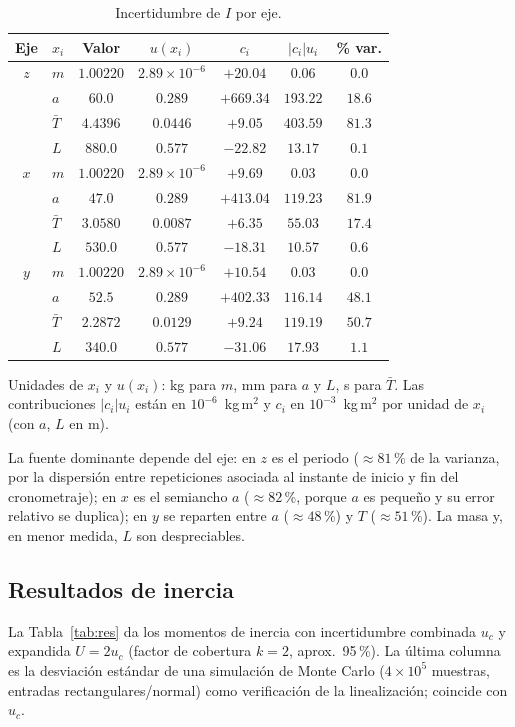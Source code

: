 \begin{table}[H]
\centering
\caption{Incertidumbre de $I$ por eje.}\label{tab:bud}
\small
\begin{tabular}{clccccc}
\toprule
Eje & $x_i$ & Valor & $u(x_i)$ & $c_i$ & $|c_i|u_i$ & \% var. \\
\midrule
$z$ & $m$ & $1.00220$ & $2.89\times10^{-6}$ & $+20.04$ & $0.06$ & $0.0$ \\
 & $a$ & $60.0$ & $0.289$ & $+669.34$ & $193.22$ & $18.6$ \\
 & $\bar T$ & $4.4396$ & $0.0446$ & $+9.05$ & $403.59$ & $81.3$ \\
 & $L$ & $880.0$ & $0.577$ & $-22.82$ & $13.17$ & $0.1$ \\
\midrule
$x$ & $m$ & $1.00220$ & $2.89\times10^{-6}$ & $+9.69$ & $0.03$ & $0.0$ \\
 & $a$ & $47.0$ & $0.289$ & $+413.04$ & $119.23$ & $81.9$ \\
 & $\bar T$ & $3.0580$ & $0.0087$ & $+6.35$ & $55.03$ & $17.4$ \\
 & $L$ & $530.0$ & $0.577$ & $-18.31$ & $10.57$ & $0.6$ \\
\midrule
$y$ & $m$ & $1.00220$ & $2.89\times10^{-6}$ & $+10.54$ & $0.03$ & $0.0$ \\
 & $a$ & $52.5$ & $0.289$ & $+402.33$ & $116.14$ & $48.1$ \\
 & $\bar T$ & $2.2872$ & $0.0129$ & $+9.24$ & $119.19$ & $50.7$ \\
 & $L$ & $340.0$ & $0.577$ & $-31.06$ & $17.93$ & $1.1$ \\
\bottomrule
\end{tabular}
\end{table}

Unidades de $x_i$ y $u(x_i)$: kg para $m$, mm para $a$ y $L$, s para $\bar T$. Las contribuciones $|c_i|u_i$ están en $10^{-6}$~kg\,m$^2$ y $c_i$ en $10^{-3}$~kg\,m$^2$ por unidad de $x_i$ (con $a$, $L$ en m).

La fuente dominante depende del eje: en $z$ es el periodo ($\approx81$\,\% de la varianza, por la dispersión entre repeticiones asociada al instante de inicio y fin del cronometraje); en $x$ es el semiancho $a$ ($\approx82$\,\%, porque $a$ es pequeño y su error relativo se duplica); en $y$ se reparten entre $a$ ($\approx48$\,\%) y $T$ ($\approx51$\,\%). La masa y, en menor medida, $L$ son despreciables.

\subsection*{Resultados de inercia}
La Tabla~\ref{tab:res} da los momentos de inercia con incertidumbre combinada $u_c$ y expandida $U=2u_c$ (factor de cobertura $k=2$, aprox.\ 95\,\%). La última columna es la desviación estándar de una simulación de Monte Carlo ($4\times10^5$ muestras, entradas rectangulares/normal) como verificación de la linealización; coincide con $u_c$.

